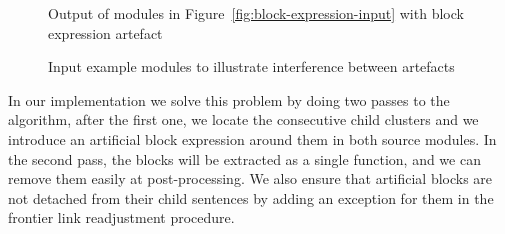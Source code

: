 \begin{figure}
\begin{minipage}[t]{0.5\textwidth}%
%
\end{minipage}%
\begin{minipage}[t]{0.5\textwidth}%
%
\end{minipage}

\begin{minipage}[t]{\textwidth}%
%
\end{minipage}

\caption{Output of modules in Figure~\ref{fig:block-expression-input} with
block expression artefact\label{fig:block-expression-after}}
\end{figure}

\begin{figure}
\begin{minipage}[t]{0.5\linewidth}%
%
\end{minipage}%
\begin{minipage}[t]{0.5\linewidth}%
%
\end{minipage}
\vspace*{-2.5mm}
\caption{Input example modules to illustrate interference between artefacts\label{fig:interference-input}}
\end{figure}



In our implementation we solve this problem by doing two passes to
the algorithm, after the first one, we locate the consecutive child
clusters and we introduce an artificial block expression around them
in both source modules. In the second pass, the blocks will be extracted
as a single function, and we can remove them easily at post-processing.
We also ensure that artificial blocks are not detached from their
child sentences by adding an exception for them in the frontier link readjustment
procedure.


